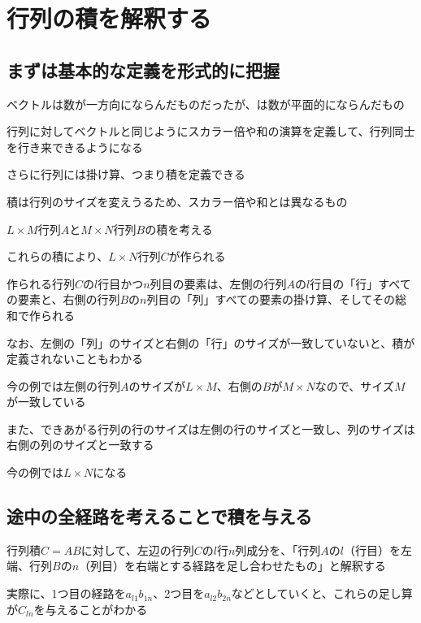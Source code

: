 \documentclass[../book_half_step_linear]{subfiles}
\begin{document}
\section{行列の積を解釈する}

\subsection{まずは基本的な定義を形式的に把握}

ベクトルは数が一方向にならんだものだったが、は数が平面的にならんだもの

\br

行列に対してベクトルと同じようにスカラー倍や和の演算を定義して、行列同士を行き来できるようになる

さらに行列には掛け算、つまり積を定義できる

積は行列のサイズを変えうるため、スカラー倍や和とは異なるもの

\br

$L \times M$行列$A$と$M \times N$行列$B$の積を考える

これらの積により、$L \times N$行列$C$が作られる

作られる行列$C$の$l$行目かつ$n$列目の要素は、左側の行列$A$の$l$行目の「行」すべての要素と、右側の行列$B$の$n$列目の「列」すべての要素の掛け算、そしてその総和で作られる

\br

なお、左側の「列」のサイズと右側の「行」のサイズが一致していないと、積が定義されないこともわかる

今の例では左側の行列$A$のサイズが$L \times M$、右側の$B$が$M \times N$なので、サイズ$M$が一致している

\br

また、できあがる行列の行のサイズは左側の行のサイズと一致し、列のサイズは右側の列のサイズと一致する

今の例では$L \times N$になる

\sectionline
\subsection{途中の全経路を考えることで積を与える}

行列積$C=AB$に対して、左辺の行列$C$の$l$行$n$列成分を、「行列$A$の$l$（行目）を左端、行列$B$の$n$（列目）を右端とする経路を足し合わせたもの」と解釈する

実際に、1つ目の経路を$a_{l1}b_{1n}$、2つ目を$a_{l2}b_{2n}$などとしていくと、これらの足し算が$C_{ln}$を与えることがわかる
\end{document}
